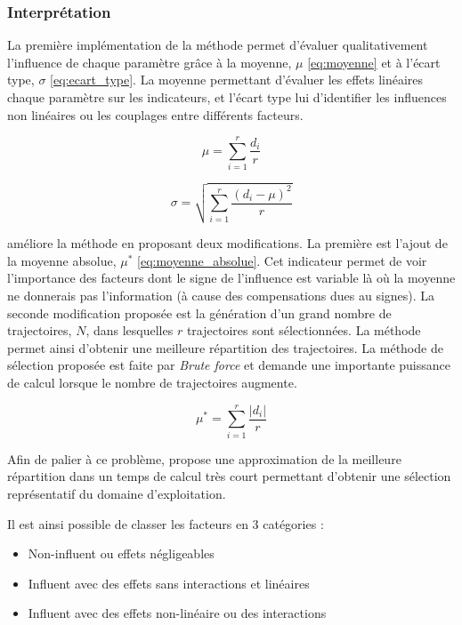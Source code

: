 \subsubsection{Interprétation} %
\label{ssub:interpretation}
La première implémentation de la méthode permet d’évaluer qualitativement l’influence de chaque
paramètre grâce à la moyenne, $\mu$ \eqref{eq:moyenne} et à l’écart type, $\sigma$ \eqref{eq:ecart_type}.
La moyenne permettant d’évaluer les effets linéaires chaque paramètre sur les indicateurs,
et l’écart type lui d’identifier les influences non linéaires ou les couplages entre différents facteurs.

\begin{equation}\label{eq:moyenne}
    \mu = \sum_{i = 1}^{r} \frac{d_{i}}{r}
\end{equation}

\begin{equation}\label{eq:ecart_type}
    \sigma = \sqrt{\sum_{i=1}^{r}\frac{(d_{i} - \mu)^{2}}{r}}
\end{equation}

\cite{Campolongo20071509} améliore la méthode en proposant deux modifications. La première
est l’ajout de la moyenne absolue, $\mu^{*}$ \eqref{eq:moyenne_absolue}. Cet indicateur permet
de voir l’importance des facteurs dont le signe de l’influence est variable là où
la moyenne ne donnerais pas l’information (à cause des compensations dues au signes).
La seconde modification proposée est la génération d’un grand nombre de trajectoires, $N$,
dans lesquelles $r$ trajectoires sont sélectionnées. La méthode permet ainsi
d’obtenir une meilleure répartition des trajectoires.
La méthode de sélection proposée est faite par \emph{Brute force} et demande une
importante puissance de calcul lorsque le nombre de trajectoires augmente.

\begin{equation}\label{eq:moyenne_absolue}
    \mu^{*} = \sum_{i = 1}^{r} \frac{\lvert d_{i} \rvert}{r}
\end{equation}

Afin de palier à ce problème, \cite{Ruano2012103} propose une approximation de
la meilleure répartition dans un temps de calcul très court permettant d’obtenir
une sélection représentatif du domaine d’exploitation.

Il est ainsi possible de classer les facteurs en 3 catégories :
\begin{itemize}
  \item Non-influent ou effets négligeables
  \item Influent avec des effets sans interactions et linéaires
  \item Influent avec des effets non-linéaire ou des interactions
\end{itemize}


